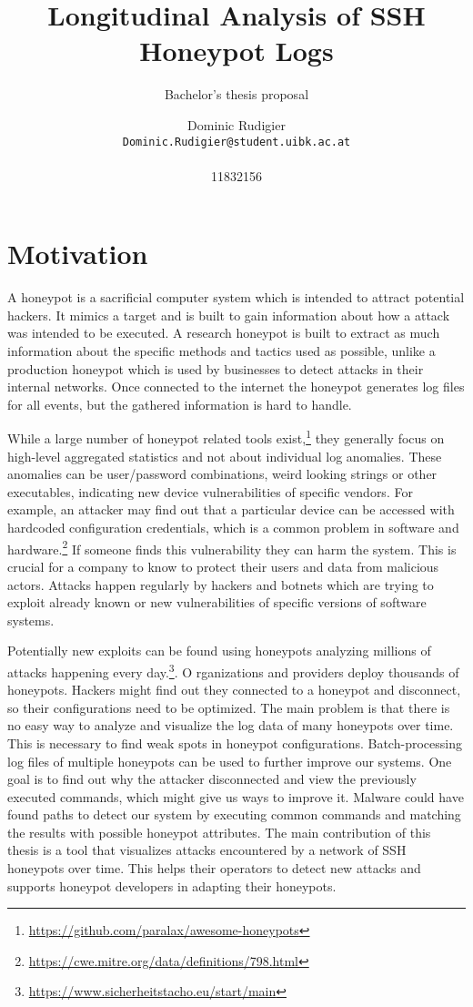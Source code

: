\documentclass[fontsize=11pt, paper=a4, parskip=half]{scrartcl}
\title{
	Longitudinal Analysis of SSH Honeypot Logs \\ 
}
\subtitle{Bachelor's thesis proposal}
\author{
	Dominic Rudigier
	\\
	\texttt{Dominic.Rudigier@student.uibk.ac.at}  
	\\ \\
	{11832156}
}
\begin{document}
\maketitle
\newpage
\section{Motivation}
A honeypot is a sacrificial computer system which is intended to attract potential hackers. It mimics a target and is built to gain information about how a attack was intended to be executed.  A research honeypot is built to extract as much information about the specific methods and tactics used as possible, unlike a production honeypot which is used by businesses to detect attacks in their internal networks. Once connected to the internet the honeypot generates log files for all events, but the gathered information is hard to handle.

While a large number of honeypot related tools exist,\footnote{\url{https://github.com/paralax/awesome-honeypots}} they generally focus on high-level aggregated statistics and not about individual log anomalies. These anomalies can be user/password combinations, weird looking strings or other executables, indicating new device vulnerabilities of specific vendors. For example, an attacker may find out that a particular device can be accessed with hardcoded configuration credentials, which is a common problem in software and hardware.\footnote{\url{https://cwe.mitre.org/data/definitions/798.html}} If someone finds this vulnerability they can harm the system. This is crucial for a company to know to protect their users and data from malicious actors. Attacks happen regularly by hackers and botnets which are trying to exploit already known or new vulnerabilities of specific versions of software systems. 

Potentially new exploits can be found using honeypots analyzing millions of attacks happening every day.\footnote{\url{https://www.sicherheitstacho.eu/start/main}}. O rganizations and providers deploy thousands of honeypots. Hackers might find out they connected to a honeypot and disconnect, so their configurations need to be optimized. The main problem is that there is no easy way to analyze and visualize the log data of many honeypots over time. This is necessary to find weak spots in honeypot configurations. Batch-processing log files of multiple honeypots can be used to further improve our systems. One goal is to find out why the attacker disconnected and view the previously executed commands, which might give us ways to improve it. Malware could have found paths to detect our system by executing common commands and matching the results with possible honeypot attributes. The main contribution of this thesis is a tool that visualizes attacks encountered by a network of SSH honeypots over time. This helps their operators to detect new attacks and supports honeypot developers in adapting their honeypots.
\end{document}
